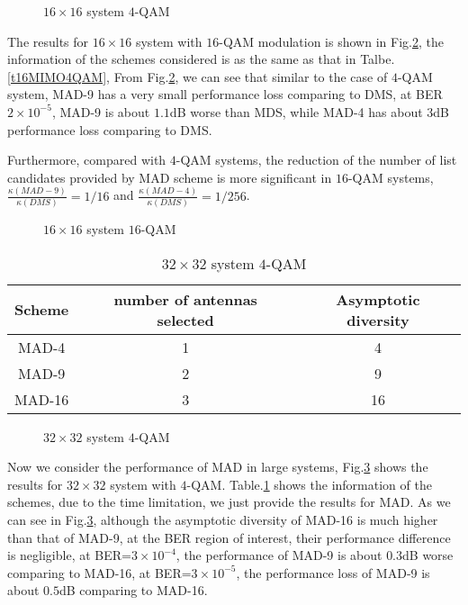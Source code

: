 \documentclass[12pt, draftclsnofoot, onecolumn]{IEEEtran}
\begin{document}
\begin{figure}[htb]
\centering
\def\svgwidth{\columnwidth}

\caption{$16\times 16$ system $4$-QAM}
\label{f16MIMO4QAM}
\end{figure}

The results for $16\times 16$ system with $16$-QAM modulation is shown in Fig.\ref{f16MIMO16QAM}, the information of the schemes considered is as the same as that in Talbe.\ref{t16MIMO4QAM}, From Fig.\ref{f16MIMO16QAM}, we can see that similar to the case of $4$-QAM system, MAD-9 has a very small performance loss comparing to DMS, at BER $2\times 10^{-5}$, MAD-9 is about $1.1$dB worse than MDS, while MAD-4 has about $3$dB  performance loss comparing to DMS.

Furthermore, compared with $4$-QAM systems, the reduction of the number of list candidates provided by MAD scheme is more significant in $16$-QAM systems, $\frac{\kappa(MAD-9)}{\kappa(DMS)}=1/16$ and $\frac{\kappa(MAD-4)}{\kappa(DMS)}=1/256$.
\begin{figure}[htb]
\centering
\def\svgwidth{\columnwidth}

\caption{$16\times 16$ system $16$-QAM}
\label{f16MIMO16QAM}
\end{figure}


\begin{table}[htb]
\renewcommand{\arraystretch}{1.3}
\caption{$32\times 32$ system $4$-QAM}
\label{t32MIMO4QAM}
\centering
\begin{tabular}{|c|c|c|}
\hline
Scheme&number of antennas selected&Asymptotic diversity\\
\hline 
MAD-4&1&4\\
\hline
MAD-9&2&9\\
\hline
MAD-16&3&16\\
\hline
\end{tabular}
\end{table}

\begin{figure}[htb]
\centering
\def\svgwidth{\columnwidth}

\caption{$32\times 32$ system $4$-QAM}
\label{f32MIMO4QAM}
\end{figure}
Now we consider the performance of MAD in large systems, Fig.\ref{f32MIMO4QAM} shows the results for $32\times 32$ system with $4$-QAM. Table.\ref{t32MIMO4QAM} shows the information of the schemes, due to the time limitation, we just provide the results for MAD. As we can see in Fig.\ref{f32MIMO4QAM}, although the asymptotic diversity of MAD-16 is much higher than that of MAD-9, at the BER region of interest, their performance difference is negligible, at BER=$3\times 10^{-4}$, the performance of MAD-9 is about $0.3$dB worse comparing to MAD-16, at BER=$3\times 10^{-5}$, the performance loss of MAD-9 is about $0.5$dB comparing to MAD-16.
\end{document}
